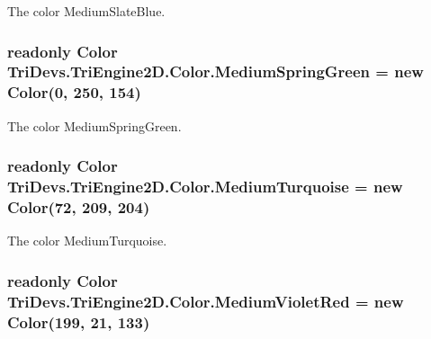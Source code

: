 The color Medium\-Slate\-Blue. 

\hypertarget{struct_tri_devs_1_1_tri_engine2_d_1_1_color_a2d6f85dd1e87a574468cf55fdd1dca91}{
\subsubsection[{Medium\-Spring\-Green}]{\setlength{\rightskip}{0pt plus 5cm}readonly {\bf Color} Tri\-Devs.\-Tri\-Engine2\-D.\-Color.\-Medium\-Spring\-Green = new {\bf Color}(0, 250, 154)\hspace{0.3cm}{\ttfamily [static]}}}\label{struct_tri_devs_1_1_tri_engine2_d_1_1_color_a2d6f85dd1e87a574468cf55fdd1dca91}


The color Medium\-Spring\-Green. 

\hypertarget{struct_tri_devs_1_1_tri_engine2_d_1_1_color_a70f58e227d17a9abf8a578267d640fe8}{
\subsubsection[{Medium\-Turquoise}]{\setlength{\rightskip}{0pt plus 5cm}readonly {\bf Color} Tri\-Devs.\-Tri\-Engine2\-D.\-Color.\-Medium\-Turquoise = new {\bf Color}(72, 209, 204)\hspace{0.3cm}{\ttfamily [static]}}}\label{struct_tri_devs_1_1_tri_engine2_d_1_1_color_a70f58e227d17a9abf8a578267d640fe8}


The color Medium\-Turquoise. 

\hypertarget{struct_tri_devs_1_1_tri_engine2_d_1_1_color_a4fefbcd5b0adb65d4fb905ff4b1fbcba}{
\subsubsection[{Medium\-Violet\-Red}]{\setlength{\rightskip}{0pt plus 5cm}readonly {\bf Color} Tri\-Devs.\-Tri\-Engine2\-D.\-Color.\-Medium\-Violet\-Red = new {\bf Color}(199, 21, 133)\hspace{0.3cm}{\ttfamily [static]}}}\label{struct_tri_devs_1_1_tri_engine2_d_1_1_color_a4fefbcd5b0adb65d4fb905ff4b1fbcba}


